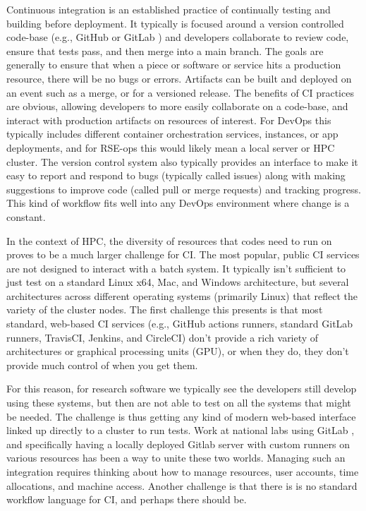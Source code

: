Continuous integration is an established practice of continually testing and
building before deployment.  It typically is focused around a version
controlled code-base (e.g., GitHub or GitLab \cite{github,gitlab}) and
developers collaborate to review code, ensure that tests pass, and then merge
into a main branch. The goals are generally to ensure that when a piece or
software or service hits a production resource, there will be no bugs or
errors. Artifacts can be built and deployed on an event such as a merge, or for
a versioned release. The benefits of CI practices are obvious, allowing
developers to more easily collaborate on a code-base, and interact with
production artifacts on resources of interest. For DevOps this typically
includes different container orchestration services, instances, or app
deployments, and for RSE-ops this would likely mean a local server or HPC
cluster. The version control system also typically provides an interface to
make it easy to report and respond to bugs (typically called issues) along with
making suggestions to improve code (called pull or merge requests) and tracking
progress.  This kind of workflow fits well into any DevOps environment where
change is a constant.

In the context of HPC, the diversity of resources that codes need to run on
proves to be a much larger challenge for CI. The most popular, public CI
services are not designed to interact with a batch system. It typically isn't
sufficient to just test on a standard Linux x64, Mac, and Windows architecture,
but several architectures across different operating systems (primarily Linux)
that reflect the variety of the cluster nodes. The first challenge this
presents is that most standard, web-based CI services (e.g., GitHub actions
runners, standard GitLab runners, TravisCI, Jenkins, and CircleCI) don't
provide a rich variety of architectures or graphical processing units (GPU), or
when they do, they don't provide much control of when you get them.

For this reason, for research software we typically see the developers still
develop using these systems, but then are not able to test on all the systems
that might be needed.  The challenge is thus getting any kind of modern
web-based interface linked up directly to a cluster to run tests. Work at
national labs using GitLab \cite{Mendoza_undated-lz,noauthor_undated-fv}, and
specifically having a locally deployed Gitlab server with custom runners on
various resources \cite{noauthor_undated-jd} has been a way to unite these two
worlds.  Managing such an integration requires thinking about how to manage
resources, user accounts, time allocations, and machine access. Another
challenge is that there is is no standard workflow language for CI, and perhaps
there should be.
